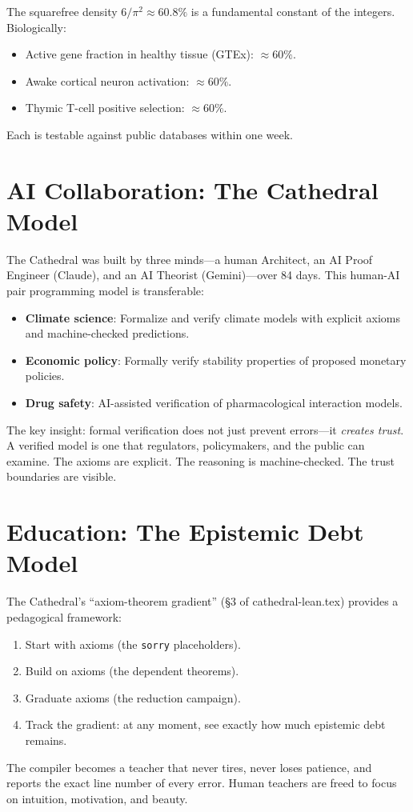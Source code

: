 \documentclass[11pt,a4paper]{article}
\begin{document}
The squarefree density $6/\pi^2 \approx 60.8\%$ is a fundamental
constant of the integers. Biologically:
\begin{itemize}
  \item Active gene fraction in healthy tissue (GTEx): $\approx 60\%$.
  \item Awake cortical neuron activation: $\approx 60\%$.
  \item Thymic T-cell positive selection: $\approx 60\%$.
\end{itemize}
Each is testable against public databases within one week.

\section{AI Collaboration: The Cathedral Model}

The Cathedral was built by three minds---a human Architect, an AI
Proof Engineer (Claude), and an AI Theorist (Gemini)---over 84 days.
This human-AI pair programming model is transferable:

\begin{itemize}
  \item \textbf{Climate science}: Formalize and verify climate
    models with explicit axioms and machine-checked predictions.
  \item \textbf{Economic policy}: Formally verify stability
    properties of proposed monetary policies.
  \item \textbf{Drug safety}: AI-assisted verification of
    pharmacological interaction models.
\end{itemize}

The key insight: formal verification does not just prevent
errors---it \emph{creates trust}. A verified model is one that
regulators, policymakers, and the public can examine. The axioms
are explicit. The reasoning is machine-checked. The trust
boundaries are visible.

\section{Education: The Epistemic Debt Model}

The Cathedral's ``axiom-theorem gradient'' (\S3 of
cathedral-lean.tex) provides a pedagogical framework:
\begin{enumerate}
  \item Start with axioms (the \texttt{sorry} placeholders).
  \item Build on axioms (the dependent theorems).
  \item Graduate axioms (the reduction campaign).
  \item Track the gradient: at any moment, see exactly how much
    epistemic debt remains.
\end{enumerate}
The compiler becomes a teacher that never tires, never loses
patience, and reports the exact line number of every error.
Human teachers are freed to focus on intuition, motivation,
and beauty.
\end{document}
